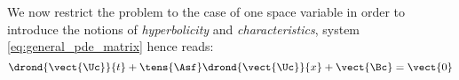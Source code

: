 We now restrict the problem to the case of one space variable in order to introduce the notions of \textit{hyperbolicity} and \textit{characteristics}, system \ref{eq:general_pde_matrix} hence reads:
\begin{equation}
  \label{eq:1d_pde_matrix}
  \drond{\vect{\Uc}}{t} + \tens{\Asf}\drond{\vect{\Uc}}{x} + \vect{\Bc} = \vect{0} 
\end{equation}










